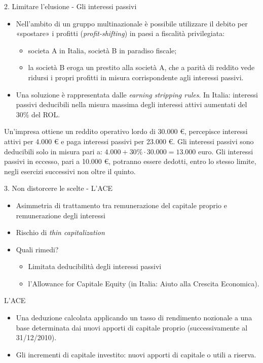 \documentclass[aspectratio=64,11pt]{beamer}
\begin{document}
\begin{frame}{2. Limitare l'elusione - Gli interessi passivi}
\begin{itemize}
\item Nell'ambito di un gruppo multinazionale è possibile utilizzare il debito per
«spostare» i profitti (\emph{profit-shifting}) in paesi a fiscalità privilegiata:
\begin{itemize}
\item societa A in Italia, società B in paradiso fiscale;
\item la società B eroga un prestito alla società A, che a parità di reddito
vede ridursi i propri profitti in misura corrispondente agli interessi
passivi.
\end{itemize}
\item Una soluzione è rappresentata dalle \emph{earning stripping rules}. In Italia:
interessi passivi deducibili nella misura massima degli interessi attivi
aumentati del 30\% del ROL.
\end{itemize}

\begin{example}[]
\small
Un'impresa ottiene un reddito operativo lordo di 30.000 €, percepisce
interessi attivi per 4.000 € e paga interessi passivi per 23.000 €.  Gli
interessi passivi sono deducibili solo in misura pari a: $4.000 + 30\% \cdot30.000
= 13.000$ euro. Gli interessi passivi in eccesso, pari a 10.000 €, potranno
essere dedotti, entro lo stesso limite, negli esercizi successivi non oltre il
quinto.
\end{example}
\end{frame}


\begin{frame}{3. Non distorcere le scelte - L'ACE}
\begin{itemize}
\item Asimmetria di trattamento tra remunerazione del capitale proprio e
remunerazione degli interessi
\item Rischio di \emph{thin capitalization}
\item Quali rimedi?
\begin{itemize}
\item Limitata deducibilità degli interessi passivi
\item l'Allowance for Capitale Equity (in Italia: Aiuto alla Crescita Economica).
\end{itemize}
\end{itemize}
\begin{block}{L'ACE}
\begin{itemize}
\item Una deduzione calcolata applicando un tasso di rendimento nozionale a una
base determinata dai nuovi apporti di capitale proprio (successivamente al
31/12/2010).
\item Gli incrementi di capitale investito: nuovi apporti di capitale o utili a
riserva.
\end{itemize}
\end{block}
\end{frame}
\end{document}
